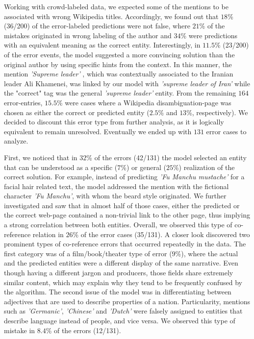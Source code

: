\documentclass[11pt]{article}
\begin{document}
Working with crowd-labeled data, we expected some of the mentions to be associated with wrong Wikipedia titles. Accordingly, we found out that $18$\% (36/200) of the error-labeled predictions were not false, where $21$\% of the mistakes originated in wrong labeling of the author and $34$\% were predictions with an equivalent meaning as the correct entity. %
Interestingly, in $11.5$\% (23/200) of the error events, the model suggested a more convincing solution than the original author by using specific hints from the context. In this manner, the  mention \textit{'Supreme leader'} , which was contextually associated to the Iranian leader Ali Khamenei, was linked by our model with \textit{'supreme leader of Iran'} while the "correct" tag was the general \textit{'supreme leader'} entity.
From the remaining $164$ error-entries, $15.5$\% were cases where a Wikipedia disambiguation-page was chosen as either the correct or predicted entity ($2.5$\% and $13$\%, respectively). We decided to discount this error type from further analysis, as it is logically equivalent to remain unresolved. Eventually we ended up with $131$ error cases to analyze.

First, we noticed that in $32$\% of the errors (42/131) the model selected an entity that can be understood as a specific ($7$\%) or general ($25$\%) realization of the correct solution. For example, instead of predicting \textit{'Fu Manchu mustache'} for a facial hair related text, the model addressed the mention with the fictional character \textit{'Fu Manchu'}, with whom the beard style originated. We further investigated and saw that in almost half of those cases, either the predicted or the correct web-page contained a non-trivial link to the other page, thus implying a strong correlation between both entities. Overall, we observed this type of co-reference relation in $26$\% of the error cases (35/131). A closer look discovered two prominent types of co-reference errors that occurred repeatedly in the data. The first category was of a film/book/theater type of error ($9$\%), where the actual and the predicted entities were a different display of the same narrative. Even though having a different jargon and producers, those fields share extremely similar content, which may explain why they tend to be frequently confused by the algorithm. The second issue of the model was in differentiating between adjectives that are used to describe properties of a nation. Particularity, mentions such as \textit{'Germanic'}, \textit{'Chinese'} and \textit{'Dutch'} were falsely assigned to entities that describe language instead of people, and vice versa. We observed this type of mistake in $8.4$\% of the errors (12/131).
\end{document}

